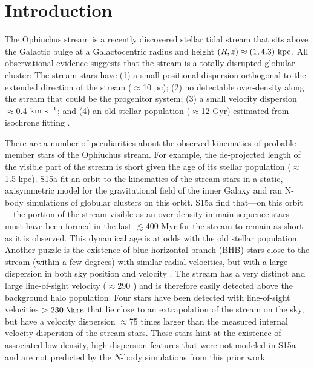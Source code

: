 \documentclass[letterpaper,12pt,preprint]{aastex}
\begin{document}

\section{Introduction}\label{sec:introduction}

The Ophiuchus stream \citep{bernard14, sesar15a} is a recently discovered stellar tidal stream that sits above the Galactic bulge at a Galactocentric radius and height $(R,z) \approx (1, 4.3)~{\rm kpc}$. All observational evidence suggests that the stream is a totally disrupted globular cluster: The stream stars have (1) a small positional dispersion orthogonal to the extended direction of the stream ($\approx$10 pc); (2) no detectable over-density along the stream that could be the progenitor system; (3) a small velocity dispersion $\approx$0.4 ${\rm km}~{\rm s}^{-1}$; and (4) an old stellar population ($\approx$12 Gyr) estimated from isochrone fitting \citep[][hereafter S15a]{sesar15a}. 

There are a number of peculiarities about the observed kinematics of probable member stars of the Ophiuchus stream. For example, the de-projected length of the visible part of the stream is short given the age of its stellar population ($\approx$1.5 kpc). S15a fit an orbit to the kinematics of the stream stars in a static, axisymmetric model for the gravitational field of the inner Galaxy and ran N-body simulations of globular clusters on this orbit. S15a find that---on this orbit---the portion of the stream visible as an over-density in main-sequence stars must have been formed in the last $\lesssim$400 Myr for the stream to remain as short as it is observed. This dynamical age is at odds with the old stellar population. Another puzzle is the existence of blue horizontal branch (BHB) stars close to the stream (within a few degrees) with similar radial velocities, but with a large dispersion in both sky position and velocity \citep[][hereafter S15b]{sesar15b}. The stream has a very distinct and large line-of-sight velocity ($\approx$290 \kms) and is therefore easily detected above the background halo population. Four stars have been detected with line-of-sight velocities $>230~\kms$ that lie close to an extrapolation of the stream on the sky, but have a velocity dispersion $\approx$75 times larger than the measured internal velocity dispersion of the stream stars. These stars hint at the existence of associated low-density, high-dispersion features that were not modeled in S15a and are not predicted by the $N$-body simulations from this prior work.
\end{document}
